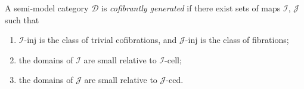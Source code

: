 \documentclass[a4paper,10pt
]{article}%
\renewcommand{\1}{\eta}%
\begin{document}
A semi-model category $\mathcal D$ is \textit{cofibrantly generated} if there exist sets of maps $\mathcal I$, $\mathcal J$ such that
\begin{enumerate}[label=(\roman*)]
\item $\mathcal I$-inj is the class of trivial cofibrations, and $\mathcal J$-inj is the class of fibrations;
\item the domains of $\mathcal I$ are small relative to $\mathcal I$-cell;
\item the domains of $\mathcal J$ are small relative to $\mathcal J$-ccd.
\end{enumerate}



	
	
\end{document}

